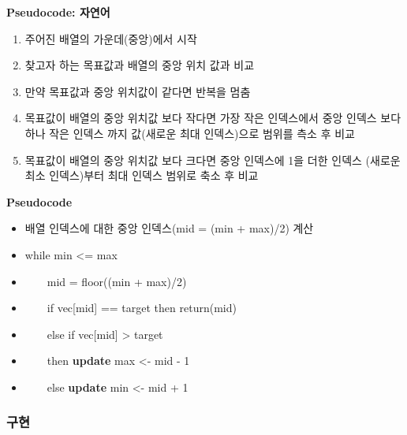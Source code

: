 \documentclass[
  11pt,
]{krantz}
\makeatletter
\providecommand{\tightlist}{%
  \setlength{\itemsep}{0pt}\setlength{\parskip}{0pt}}
\newenvironment{kframe}{%
\medskip{}
\setlength{\fboxsep}{.8em}
 \def\at@end@of@kframe{}%
 \ifinner\ifhmode%
  \def\at@end@of@kframe{\end{minipage}}%
  \begin{minipage}{\columnwidth}%
 \fi\fi%
 \def\FrameCommand##1{\hskip\@totalleftmargin \hskip-\fboxsep
 \colorbox{shadecolor}{##1}\hskip-\fboxsep
     \hskip-\linewidth \hskip-\@totalleftmargin \hskip\columnwidth}%
 \MakeFramed {\advance\hsize-\width
   \@totalleftmargin\z@ \linewidth\hsize
   \@setminipage}}%
 {\par\unskip\endMakeFramed%
 \at@end@of@kframe}
\renewenvironment{quote}{\begin{kframe}}{\end{kframe}}
\makeatother
\begin{document}
\textbf{Pseudocode: 자연어}

\begin{quote}
\begin{enumerate}
\def\labelenumi{\arabic{enumi}.}
\tightlist
\item
  주어진 배열의 가운데(중앙)에서 시작
\item
  찾고자 하는 목표값과 배열의 중앙 위치 값과 비교
\item
  만약 목표값과 중앙 위치값이 같다면 반복을 멈춤
\item
  목표값이 배열의 중앙 위치값 보다 작다면 가장 작은 인덱스에서
  중앙 인덱스 보다 하나 작은 인덱스 까지 값(새로운 최대 인덱스)으로 범위를 측소 후 비교
\item
  목표값이 배열의 중앙 위치값 보다 크다면 중앙 인덱스에 1을 더한 인덱스
  (새로운 최소 인덱스)부터 최대 인덱스 범위로 축소 후 비교
\end{enumerate}
\end{quote}

\textbf{Pseudocode}

\begin{quote}
\begin{itemize}
\tightlist
\item
  배열 인덱스에 대한 중앙 인덱스(mid = (min + max)/2) 계산
\item
  while min \textless= max
\item
  ~~~~mid = floor((min + max)/2)
\item
  ~~~~if vec{[}mid{]} == target then return(mid)
\item
  ~~~~else if vec{[}mid{]} \textgreater{} target
\item
  ~~~~then \textbf{update} max \textless- mid - 1
\item
  ~~~~else \textbf{update} min \textless- mid + 1
\end{itemize}
\end{quote}

\hypertarget{uxad6cuxd604-2}{%
\subsubsection*{구현}\label{uxad6cuxd604-2}}


\footnotesize
\end{document}
